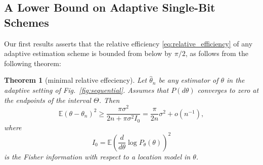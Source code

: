 \documentclass[letterpaper, conference]{IEEEtran}      %
\newtheorem{thm}{\bf{Theorem}}
\begin{document}
%  
%
%
%
%  


\subsection{A Lower Bound on Adaptive Single-Bit Schemes}
Our first results asserts that the relative efficiency \eqref{eq:relative_efficiency} of any adaptive estimation scheme is bounded from below by $\pi/2$, as follows from the following theorem:
\begin{thm}[minimal relative effeciency] \label{thm:adpative_lower_bound}
Let $\widehat{\theta}_n$ be any estimator of $\theta$ in the adaptive setting of Fig.~\ref{fig:sequential}.
Assumes that $P(d\theta)$ converges to zero at the endpoints of the interval $\Theta$. Then
\[
\mathbb E (\theta-\theta_n)^2 \geq  \frac{\pi \sigma^2 }{2n +\pi \sigma^2  I_0}  =  \frac{\pi}{2n}\sigma^2+o(n^{-1}),
\]
where 
\[
I_0 = \mathbb E \left( \frac{d}{d\theta} \log P_\theta(\theta) \right)^2
\]
is the Fisher information with respect to a location model in $\theta$. 
\end{thm}
\end{document}
